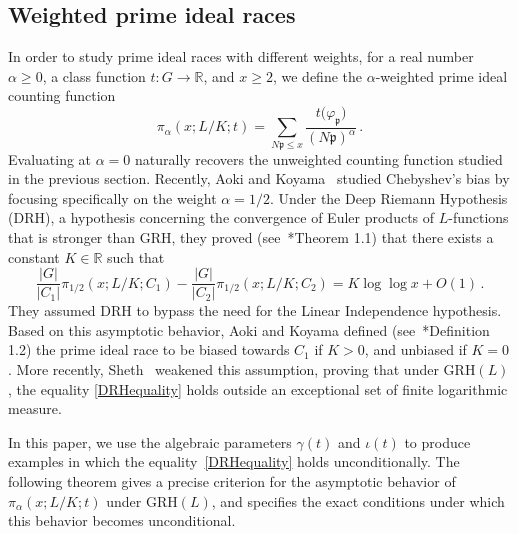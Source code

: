 \documentclass[12pt]{amsart}
\numberwithin{equation}{section}
\newcommand{\R}{\mathbb R}
\theoremstyle{definition}
\theoremstyle{remark}
\begin{document}
\subsection{Weighted prime ideal races}\label{Weightedfunctions}

In order to study prime ideal races with different weights, for a real number $\alpha \ge 0$, a class function $t:G\to \R$, and $x\ge2$, we define the $\alpha$-weighted prime ideal counting function
\begin{equation}
    \pi_\alpha(x;L/K;t)=\sum_{N\mathfrak{p}\le x}\frac{t\bigl(\varphi_\mathfrak{p}\bigr)}{(N\mathfrak{p})^\alpha}\, .
\end{equation}
Evaluating at $\alpha=0$ naturally recovers the unweighted counting function studied in the previous section. Recently, Aoki and Koyama~\cite{Ao-Ko} studied Chebyshev's bias by focusing specifically on the weight $\alpha=1/2$. Under the Deep Riemann Hypothesis ($\mathrm{DRH}$), a hypothesis concerning the convergence of Euler products of $L$-functions that is stronger than $\mathrm{GRH}$, they proved (see~\cite{Ao-Ko}*{Theorem 1.1}) that there exists a constant $K\in \R$ such that
\begin{equation}\label{DRHequality}
    \frac{|G|}{|C_1|}\pi_{1/2}(x;L/K;C_1)-\frac{|G|}{|C_2|}\pi_{1/2}(x;L/K;C_2)= K \log \log x+O(1)\, .
\end{equation}
They assumed $\mathrm{DRH}$ to bypass the need for the Linear Independence hypothesis. Based on this asymptotic behavior, Aoki and Koyama defined (see~\cite{Ao-Ko}*{Definition 1.2}) the prime ideal race to be biased towards $C_1$ if $K>0$, and unbiased if $K=0$. More recently, Sheth~\cite{Sheth} weakened this assumption, proving that under $\mathrm{GRH}(L)$, the equality \eqref{DRHequality} holds outside an exceptional set of finite logarithmic measure. 

In this paper, we use the algebraic parameters $\gamma(t)$ and $\iota(t)$ to produce examples in which the equality~\eqref{DRHequality} holds unconditionally. The following theorem gives a precise criterion for the asymptotic behavior of $\pi_\alpha(x;L/K;t)$ under $\mathrm{GRH}(L)$, and specifies the exact conditions under which this behavior becomes unconditional.
\end{document}
